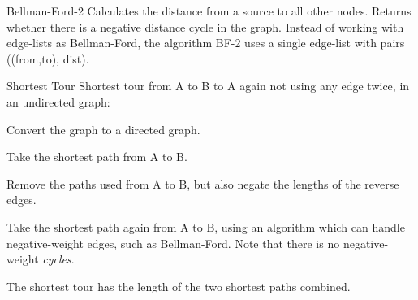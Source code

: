 
\begin{algorithm}{Bellman-Ford-2}
\desc
Calculates the distance from a source to all other nodes.
Returns whether there is a negative distance cycle in the graph.
Instead of working with edge-lists as Bellman-Ford, the algorithm BF-2 uses
a single edge-list with pairs ((from,to), dist).
\end{algorithm}


\begin{algorithm}{Shortest Tour}
\desc
Shortest tour from A to B to A again not using any edge twice, in an
undirected graph:

Convert the graph to a directed graph.

Take the shortest path from A to B.

Remove the paths used from A to B, but also negate the lengths of the
reverse edges.

Take the shortest path again from A to B, using an algorithm which can handle
negative-weight edges, such as Bellman-Ford. Note that there is no
negative-weight \emph{cycles}.

The shortest tour has the length of the two shortest paths combined.
\end{algorithm}
